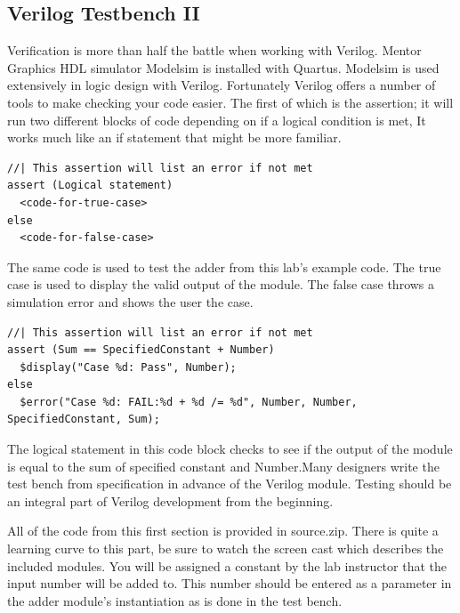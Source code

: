 \documentclass[12pt,journal]{IEEEtran}
\begin{document}
  \subsection{Verilog Testbench II}
    Verification is more than half the battle when working with Verilog. Mentor Graphics HDL simulator Modelsim is installed with Quartus. Modelsim is used extensively in logic design with Verilog. Fortunately Verilog offers a number of tools to make checking your code easier. The first of which is the assertion; it will run two different blocks of code depending on if a logical condition is met, It works much like an if statement that might be more familiar.
    \begin{lstlisting}[caption={Template for System Verilog assertion}]
//| This assertion will list an error if not met
assert (Logical statement)
  <code-for-true-case>
else
  <code-for-false-case>
    \end{lstlisting}

    The same code is used to test the adder from this lab's example code. The true case is used to display the valid output of the module. The false case throws a simulation error and shows the user the case. 
    \begin{lstlisting}[caption={Assertion Example from test bench}]
//| This assertion will list an error if not met
assert (Sum == SpecifiedConstant + Number)
  $display("Case %d: Pass", Number);
else
  $error("Case %d: FAIL:%d + %d /= %d", Number, Number, SpecifiedConstant, Sum);
    \end{lstlisting} 
    The logical statement in this code block checks to see if the output of the module is equal to the sum of specified constant and Number.Many designers write the test bench from specification in advance of the Verilog module. Testing should be an integral part of Verilog development from the beginning.

    All of the code from this first section is provided in source.zip. There is quite a learning curve to this part, be sure to watch the screen cast which describes the included modules. You will be assigned a constant by the lab instructor that the input number will be added to. This number should be entered as a parameter in the adder module's instantiation as is done in the test bench.
\end{document}
